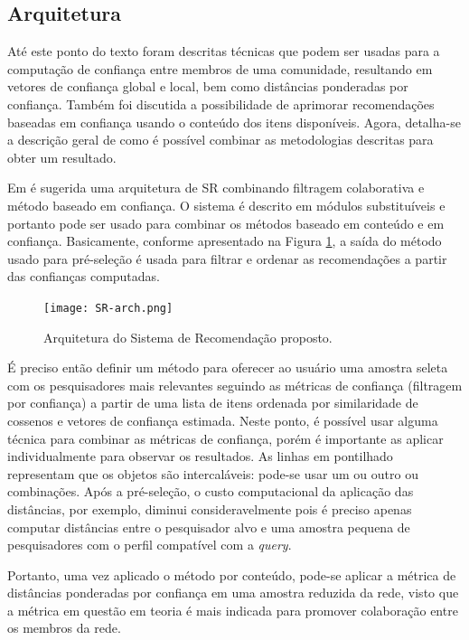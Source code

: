 \documentclass[12pt]{article}
\begin{document}
\subsection{Arquitetura} \label{sect:arch}

Até este ponto do texto foram descritas técnicas que podem ser usadas para a computação de confiança entre membros de uma comunidade, resultando 
em vetores de confiança global e local, bem como distâncias ponderadas por confiança. Também foi discutida a possibilidade de 
aprimorar recomendações baseadas em confiança usando o conteúdo dos itens disponíveis. Agora, detalha-se a descrição geral de como é 
possível combinar as metodologias descritas para obter um resultado. 

Em \cite{massa2004trust} é sugerida uma arquitetura de SR combinando filtragem colaborativa e método baseado em confiança. O sistema é descrito em módulos substituíveis e portanto pode ser usado para combinar os métodos baseado em conteúdo e em confiança. Basicamente, conforme apresentado na Figura \ref{fig:sr-arch}, a saída do método usado para pré-seleção é usada 
para filtrar e ordenar as recomendações a partir das confianças computadas.


 \begin{figure}[ht]
    \centering
   \texttt{[image: SR-arch.png]}
   \caption{Arquitetura do Sistema de Recomendação proposto.}
   \label{fig:sr-arch}
 \end{figure}


É preciso então definir um método para oferecer ao usuário uma amostra seleta com os pesquisadores mais relevantes seguindo as métricas de confiança (filtragem por confiança) a partir de uma lista de itens ordenada por similaridade de cossenos e vetores de 
confiança estimada. Neste ponto, é possível usar alguma técnica para combinar as métricas de confiança, porém é importante 
as aplicar individualmente para observar os resultados. As linhas em pontilhado representam que os objetos são intercaláveis: 
pode-se usar um ou outro ou combinações. Após a pré-seleção, o custo computacional da aplicação das distâncias, por exemplo, 
diminui consideravelmente pois é preciso apenas computar distâncias entre o pesquisador alvo e uma amostra pequena de 
pesquisadores com o perfil compatível com a \textit{query}.

Portanto, uma vez aplicado o método por conteúdo, pode-se  aplicar a métrica de distâncias ponderadas por confiança em uma 
amostra reduzida da rede, visto que a métrica em questão em teoria é mais indicada para promover colaboração entre os membros da 
rede.
\end{document}
